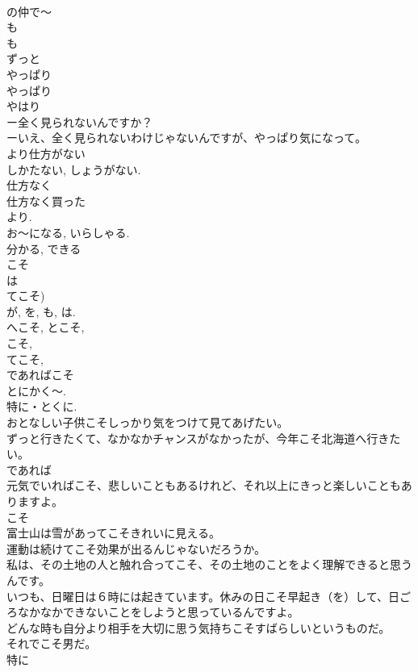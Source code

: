 \documentclass[8pt]{extreport}
\begin{document}
\begin{CJK}{UTF8}{min}
\\	の仲で～　 
\\	も
\\	も
\\	ずっと
\\	やっぱり
\\	やっぱり 
\\	やはり 
\\	ー全く見られないんですか？ 
\\	ーいえ、全く見られないわけじゃないんですが、やっぱり気になって。
\\	より仕方がない
\\	しかたない, しょうがない.
\\	仕方なく 
\\	仕方なく買った
\\	より.	
\\	お～になる, いらしゃる.
\\	分かる, できる 
\\	こそ
\\	は
\\	てこそ)
\\	が, を, も, は. 
\\	へこそ, とこそ, 
\\	こそ, 
\\	てこそ, 
\\	であればこそ
\\	とにかく～. 
\\	特に・とくに. 
\\	おとなしい子供こそしっかり気をつけて見てあげたい。
\\	ずっと行きたくて、なかなかチャンスがなかったが、今年こそ北海道へ行きたい。
\\	であれば 
\\	元気でいればこそ、悲しいこともあるけれど、それ以上にきっと楽しいこともありますよ。
\\	こそ
\\	富士山は雪があってこそきれいに見える。
\\	運動は続けてこそ効果が出るんじゃないだろうか。
\\	私は、その土地の人と触れ合ってこそ、その土地のことをよく理解できると思うんです。
\\	いつも、日曜日は６時には起きています。休みの日こそ早起き（を）して、日ごろなかなかできないことをしようと思っているんですよ。
\\	どんな時も自分より相手を大切に思う気持ちこそすばらしいというものだ。
\\	それでこそ男だ。
\\	特に 

\end{CJK}
\end{document}
